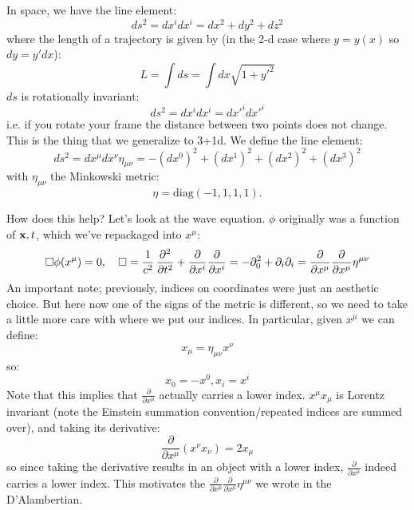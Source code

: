 In space, we have the line element:
\begin{equation}
    ds^2 = dx^i dx^i = dx^2 + dy^2 + dz^2
\end{equation}
where the length of a trajectory is given by (in the 2-d case where $y = y(x)$ so $dy = y'dx$):
\begin{equation}
    L = \int ds = \int dx \sqrt{1 + y'^2}
\end{equation}
$ds$ is rotationally invariant:
\begin{equation}
    ds^2 = dx^idx^i = dx'^i dx'^i
\end{equation}
i.e. if you rotate your frame the distance between two points does not change. This is the thing that we generalize to 3+1d. We define the line element:
\begin{equation}
    ds^2 = dx^\mu dx^\nu \eta_{\mu\nu} = -(dx^0)^2 + (dx^1)^2 + (dx^2)^2 + (dx^3)^2
\end{equation}
with $\eta_{\mu\nu}$ the Minkowski metric:
\begin{equation}
    \eta = \text{diag}(-1, 1, 1, 1).
\end{equation}

How does this help? Let's look at the wave equation. $\phi$ originally was a function of $\mathbf{x}, t$, which we've repackaged into $x^\mu$:
\begin{equation}
    \square \phi(x^\mu) = 0, \quad \square = \frac{1}{c^2}\dpd[2]{}{t} + \frac{\partial}{\partial x^i}\frac{\partial}{\partial x^i} = -\p_0^2 + \p_i \p_i = \frac{\partial}{\partial x^\mu}\frac{\partial}{\partial x^\mu}\eta^{\mu\nu}
\end{equation}
An important note; previously, indices on coordinates were just an aesthetic choice. But here now one of the signs of the metric is different, so we need to take a little more care with where we put our indices. In particular, given $x^\mu$ we can define:
\begin{equation}
    x_\mu = \eta_{\mu\nu}x^\nu
\end{equation}
so:
\begin{equation}
    x_0 = -x^0, x_i = x^i
\end{equation}
Note that this implies that $\frac{\partial}{\partial x^\mu}$ actually carries a lower index. $x^\mu x_\mu$ is Lorentz invariant (note the Einstein summation convention/repeated indices are summed over), and taking its derivative:
\begin{equation}
    \frac{\partial}{\partial x^\mu}(x^\nu x_\nu) = 2x_\mu
\end{equation}
so since taking the derivative results in an object with a lower index, $\frac{\partial}{\partial x^\mu}$ indeed carries a lower index. This motivates the $\frac{\partial}{\partial x^\mu}\frac{\partial}{\partial x^\mu}\eta^{\mu\nu}$ we wrote in the D'Alambertian.

